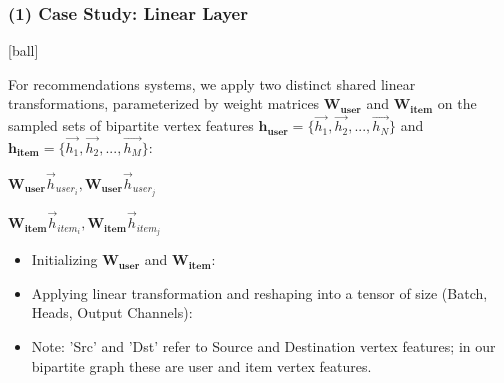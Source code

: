 \documentclass{beamer}
\begin{document}

\begin{frame}[fragile]
\begin{itemize}
\frametitle{(1) Case Study: Linear Layer}
[ball]

\item For recommendations systems, we apply two distinct shared linear transformations, parameterized by weight matrices $\mathbf{W_{\text{user}}}$ and $\mathbf{W_{\text{item}}}$ on the sampled sets of bipartite vertex features $\mathbf{h_{\text{user}}} = \{\overrightarrow{h_{1}},\overrightarrow{h_{2}},...,\overrightarrow{h_{N}} \}$ and $\mathbf{h_{\text{item}}} = \{\overrightarrow{h_{1}},\overrightarrow{h_{2}},...,\overrightarrow{h_{M}} \}$:

\begin{center}
    \item[] $\mathbf{W_{\text{user}}}\overrightarrow{h}_{user_{i}}, \mathbf{W_{\text{user}}}\overrightarrow{h}_{user_{j}}$
    \vspace{0.3cm}
    \item[] $\mathbf{W_{\text{item}}}\overrightarrow{h}_{item_{i}}, \mathbf{W_{\text{item}}}\overrightarrow{h}_{item_{j}}$

\end{center}
\end{itemize}
\end{frame}


\begin{frame}[fragile]
\begin{itemize}
\frametitle{(1) Linear Layer: Code}
[ball]

\item Initializing $\mathbf{W_{\text{user}}}$ and $\mathbf{W_{\text{item}}}$:



\item Applying linear transformation and reshaping into a tensor of size (Batch, Heads, Output Channels):



\item Note: 'Src' and 'Dst' refer to Source and Destination vertex features; in our bipartite graph these are user and item vertex features.

\end{itemize}
\end{frame}
\end{document}
